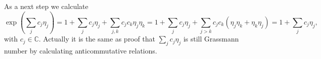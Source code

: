 As a next step we calculate 
\begin{equation*}
	\exp\left(
		\sum_j c_j \eta_j
	\right) = 1 + \sum_j c_j \eta_j + 
	\sum_{j,k} c_j c_k \eta_j \eta_k = 
	 1 + \sum_j c_j \eta_j + 
	\sum_{j>k} c_j c_k (\eta_j \eta_k+\eta_k \eta_j) =  1 + \sum_j c_j \eta_j 
	,
\end{equation*}
with $c_j \in \mathbb{C}$. Actually it is the same as proof that $\sum_j c_j \eta_j $ is still Grassmann number by calculating anticommutative relations.